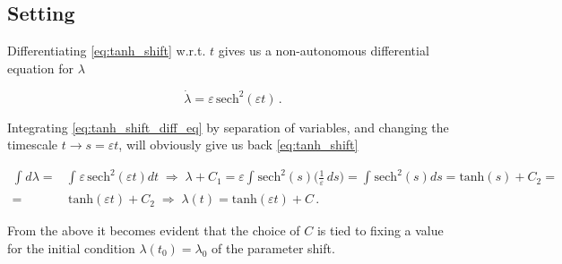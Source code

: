 \documentclass[../main.tex]{subfiles}
\begin{document}
\subsection{Setting}\label{subsec:setting}

Differentiating \eqref{eq:tanh_shift} w.r.t. $t$ gives us a non-autonomous differential equation for $\lambda$

\begin{equation}\label{eq:tanh_shift_diff_eq}
        \dot{\lambda} = \varepsilon\,\text{sech}^{2}(\varepsilon t)\,.
\end{equation}

Integrating \eqref{eq:tanh_shift_diff_eq} by separation of variables, and changing the timescale $t\to s = \varepsilon t$, will obviously give us back \eqref{eq:tanh_shift}

\begin{align*}
     \int_{}^{}d\lambda =& \int_{}^{}\varepsilon\,\text{sech}^{2}(\varepsilon t)dt \;\Rightarrow\; \lambda + C_{1} = \varepsilon \int_{}^{}\text{sech}^{2}(s)\bigg(\frac{1}{\varepsilon}\,ds\bigg) = \int_{}^{}\text{sech}^{2}(s)ds = \text{tanh}(s) + C_{2} = \nonumber \\
        =& \, \text{tanh}(\varepsilon t) + C_{2} \;\Rightarrow\; \lambda(t) = \text{tanh}(\varepsilon t) + C\,.
\end{align*}

From the above it becomes evident that the choice of $C$ is tied to fixing a value for the initial condition $\lambda(t_{0}) = \lambda_{0}$ of the parameter shift.


\end{document}
